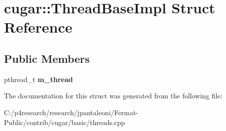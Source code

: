\hypertarget{structcugar_1_1_thread_base_impl}{}\section{cugar\+:\+:Thread\+Base\+Impl Struct Reference}
\label{structcugar_1_1_thread_base_impl}
\subsection*{Public Members}
\begin{DoxyCompactItemize}
\item 
\mbox{\label{structcugar_1_1_thread_base_impl_a88447d101728f7ef69527e3024b32514}} 
pthread\+\_\+t {\bfseries m\+\_\+thread}
\end{DoxyCompactItemize}


The documentation for this struct was generated from the following file\+:\begin{DoxyCompactItemize}
\item 
C\+:/p4research/research/jpantaleoni/\+Fermat-\/\+Public/contrib/cugar/basic/threads.\+cpp\end{DoxyCompactItemize}
